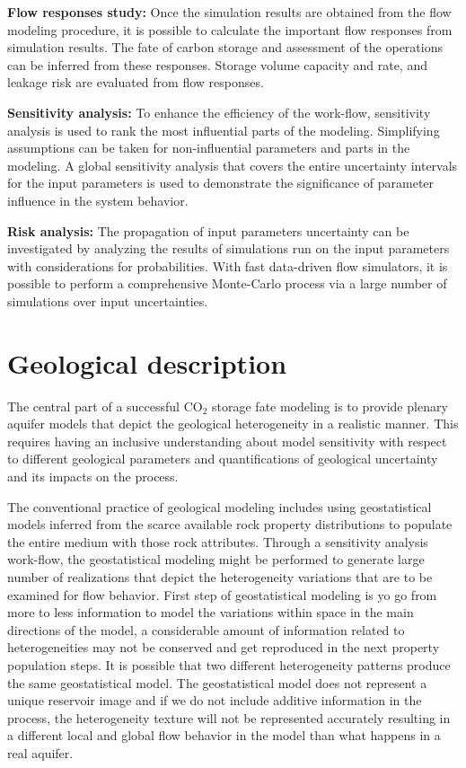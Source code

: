 \textbf{Flow responses study:} Once the simulation results are obtained from the flow modeling procedure, it is possible to calculate the important flow responses from simulation results. The fate of carbon storage and assessment of the operations can be inferred from these responses. Storage volume capacity and rate, and leakage risk are evaluated from flow responses.

\textbf{Sensitivity analysis:} To enhance the efficiency of the work-flow, sensitivity analysis is used to rank the most influential parts of the modeling. Simplifying assumptions can be taken for non-influential parameters and parts in the modeling. A global sensitivity analysis that covers the entire uncertainty intervals for the input parameters is used to demonstrate the significance of parameter influence in the system behavior.

\textbf{Risk analysis:} The propagation of input parameters uncertainty can be investigated by analyzing the results of simulations run on the input parameters with considerations for probabilities. With fast data-driven flow simulators, it is possible to perform a comprehensive Monte-Carlo process via a large number of simulations  over input uncertainties.

\section{Geological description}


The central part of a successful $\mbox{CO}_2$ storage fate modeling is to provide plenary aquifer models that depict the geological heterogeneity in a realistic manner. This requires having an inclusive understanding about model sensitivity with respect to different geological parameters and quantifications of geological uncertainty and its impacts on the process. 

The conventional practice of geological modeling includes using geostatistical models inferred from the scarce available rock property distributions to populate the entire medium with those rock attributes. Through a sensitivity analysis work-flow, the geostatistical modeling might be performed to generate large number of realizations that depict the heterogeneity variations that are to be examined for flow behavior. First step of geostatistical modeling is yo go from more to less information to model the variations within space in the main directions of the model, a considerable amount of information related to heterogeneities may not be conserved and get reproduced in the next property population steps. It is possible that two different heterogeneity patterns produce the same geostatistical model. The geostatistical model does not represent a unique reservoir image and if we do not include additive information in the process, the heterogeneity texture will not be represented accurately resulting in a different local and global flow behavior in the model than what happens in a real aquifer. 


